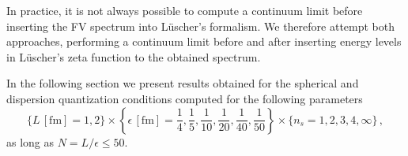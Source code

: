 In practice, it is not always possible to compute a continuum limit before inserting the FV spectrum into Lüscher's formalism.
We therefore attempt both approaches, performing a continuum limit before and after inserting energy levels in Lüscher's zeta function to the obtained spectrum.

In the following section we present results obtained for the spherical and dispersion quantization conditions computed for the following parameters
\begin{equation}
    \{ L \,[\mathrm{fm}]= 1, 2 \}
    \times \left\{ \epsilon \,[\mathrm{fm}] = \frac{1}{4}, \frac{1}{5}, \frac{1}{10}, \frac{1}{20}, \frac{1}{40}, \frac{1}{50} \right\}
    \times \{ n_s = 1, 2, 3, 4, \infty \}
    \, ,
\end{equation}
as long as $N = L / \epsilon \leq 50$.




